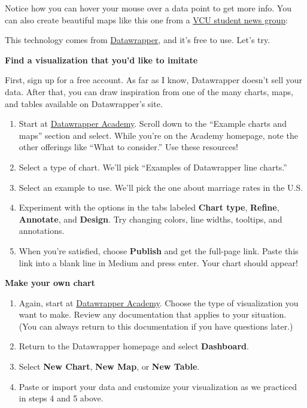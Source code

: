 \documentclass[]{book}
\providecommand{\tightlist}{%
  \setlength{\itemsep}{0pt}\setlength{\parskip}{0pt}}
\theoremstyle{definition}
\theoremstyle{definition}
\theoremstyle{definition}
\theoremstyle{remark}
\begin{document}
\hypertarget{K8lFJG}{}

Notice how you can hover your mouse over a data point to get more info.
You can also create beautiful maps like this one from a
\href{https://vcucns.com/about-cns/}{VCU student news group}:

This technology comes from
\href{https://www.datawrapper.de}{Datawrapper}, and it's free to use.
Let's try.

\textbf{Find a visualization that you'd like to imitate}

First, sign up for a free account. As far as I know, Datawrapper doesn't
sell your data. After that, you can draw inspiration from one of the
many charts, maps, and tables available on Datawrapper's site.

\begin{enumerate}
\def\labelenumi{\arabic{enumi}.}
\tightlist
\item
  Start at \href{https://academy.datawrapper.de/}{Datawrapper Academy}.
  Scroll down to the ``Example charts and maps'' section and select.
  While you're on the Academy homepage, note the other offerings like
  ``What to consider.'' Use these resources!
\item
  Select a type of chart. We'll pick ``Examples of Datawrapper line
  charts.''
\item
  Select an example to use. We'll pick the one about marriage rates in
  the U.S.
\item
  Experiment with the options in the tabs labeled \textbf{Chart type},
  \textbf{Refine}, \textbf{Annotate}, and \textbf{Design}. Try changing
  colors, line widths, tooltips, and annotations.
\item
  When you're satisfied, choose \textbf{Publish} and get the full-page
  link. Paste this link into a blank line in Medium and press enter.
  Your chart should appear!
\end{enumerate}

\textbf{Make your own chart}

\begin{enumerate}
\def\labelenumi{\arabic{enumi}.}
\tightlist
\item
  Again, start at \href{https://academy.datawrapper.de/}{Datawrapper
  Academy}. Choose the type of visualization you want to make. Review
  any documentation that applies to your situation. (You can always
  return to this documentation if you have questions later.)
\item
  Return to the Datawrapper homepage and select \textbf{Dashboard}.
\item
  Select \textbf{New Chart}, \textbf{New Map}, or \textbf{New Table}.
\item
  Paste or import your data and customize your visualization as we
  practiced in steps 4 and 5 above.
\end{enumerate}
\end{document}

